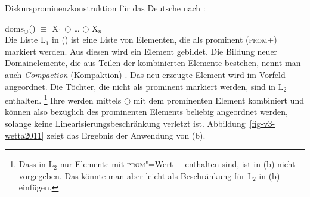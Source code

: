 \begin{exe}
\ex Diskursprominenzkonstruktion für das Deutsche nach \citet[]{Wetta2011a}:
\begin{xlist}
\ex doms$_\bigcirc$() $\equiv$ X$_1$
$\bigcirc$ \ldots{} $\bigcirc$ X$_n$
\ex {} \impl\\
\zl
Die Liste L$_1$ in () ist eine Liste von Elementen, die als prominent (\textsc{prom}+)
markiert werden. Aus diesen wird ein Element gebildet. Die Bildung neuer Domainelemente, die aus
Teilen der kombinierten Elemente bestehen, nennt man auch \emph{Compaction} (Kompaktion) \citep[175]{KP95a}. Das neu
erzeugte Element wird im Vorfeld angeordnet. Die Töchter, die nicht als prominent markiert werden,
sind in L$_2$ enthalten.%
\footnote{
  Dass in L$_2$ nur Elemente mit \textsc{prom}"=Wert $-$ enthalten sind, ist in 
  (b) nicht vorgegeben. Das könnte man aber leicht als Beschränkung für L$_2$ in (b) einfügen.
}
Ihre \domwe werden mittels $\bigcirc$ mit dem prominenten Element kombiniert und können also
bezüglich des prominenten Elements beliebig angeordnet werden, solange keine
Linearisierungsbeschränkung verletzt ist. Abbildung~\ref{fig-v3-wetta2011} zeigt das Ergebnis der
Anwendung von (b).

\end{xlist}
\end{exe}
